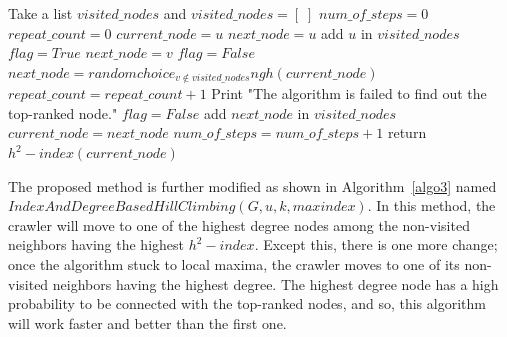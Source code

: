 \documentclass[12pt,3p]{article}
\begin{document}
\begin{algorithm}
\caption{$IndexBasedHillClimbing(G,u,k,maxindex)$}
\label{algo2}
\begin{algorithmic}
\STATE Take a list $visited\_nodes$ and $visited\_nodes = [\;]$
\STATE $num\_of\_steps=0$
\STATE $repeat\_count=0$
\STATE $current\_node=u$
\STATE $next\_node=u$
\STATE add $u$ in $visited\_nodes$
\STATE $flag=True$
\STATE $next\_node=v$
\ENDIF
\ENDFOR
{}
\STATE $flag=False$
\STATE $next\_node=randomchoice_{v \notin visited\_nodes}ngh(current\_node)$
\STATE $repeat\_count=repeat\_count+1$
\ELSE
\STATE Print "The algorithm is failed to find out the top-ranked node."
\STATE $flag=False$
\ENDIF
\ENDIF
{}
\STATE add $next\_node$ in $visited\_nodes$	
\STATE $current\_node=next\_node$
\STATE $num\_of\_steps=num\_of\_steps+1$
\ENDIF
\ENDWHILE
\STATE return $h^2-index(current\_node)$
\end{algorithmic}
\end{algorithm}

The proposed method is further modified as shown in Algorithm~\ref{algo3} named $IndexAndDegreeBasedHillClimbing(G,u,k,maxindex)$. In this method, the crawler will move to one of the highest degree nodes among the non-visited neighbors having the highest $h^2-index$. Except this, there is one more change; once the algorithm stuck to local maxima, the crawler moves to one of its non-visited neighbors having the highest degree. The highest degree node has a high probability to be connected with the top-ranked nodes, and so, this algorithm will work faster and better than the first one.
\end{document}
